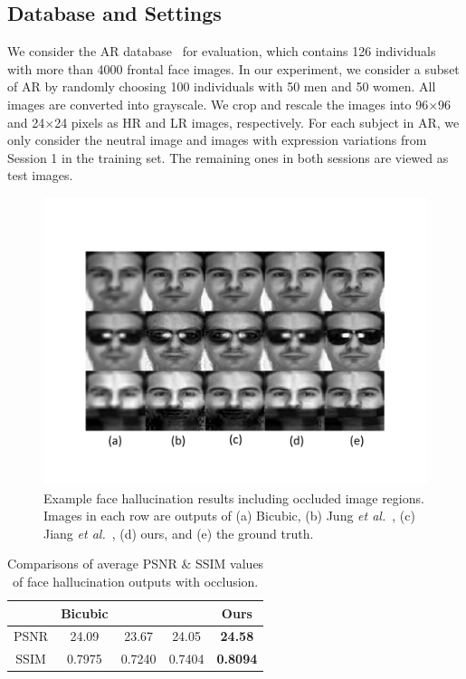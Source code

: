 \subsection{Database and Settings}
We consider the AR database~\cite{Martinez_CVC1998} for evaluation, which contains 126 individuals with more than 4000 frontal face images. In our experiment, we consider a subset of AR by randomly choosing 100 individuals with 50 men and 50 women. All images are converted into grayscale. We crop and rescale the images into 96$\times$96 and 24$\times$24 pixels as HR and LR images, respectively. For each subject in AR, we only consider the neutral image and images with expression variations from Session 1 in the training set. The remaining ones in both sessions are viewed as test images.
\begin{figure}
\graphicspath{{fig/}}
        \begin{center}
            \includegraphics[scale=0.32]{exp_ori.pdf}
            \vspace{-0.3cm}
            \caption{\small{Example face hallucination results including occluded image regions. Images in each row are outputs of (a) Bicubic, (b) Jung \emph{et al.}~\cite{convex}, (c) Jiang \emph{et al.}~\cite{Jiang_TMM2014}, (d) ours, and (e) the ground truth.} \label{fig:exp_ori}}
        \end{center}\vspace{-.5cm}
\end{figure}

\begin{table}
\small
\renewcommand{\arraystretch}{1.2}
\centering
\caption{\small{Comparisons of average PSNR \& SSIM values of face hallucination outputs with occlusion.}}\label{tab:partA}
\vspace{0.2cm}
\begin{tabular}{|c|c|c|c|c|}
\hline
 & Bicubic & \cite{convex} & \cite{Jiang_TMM2014}  & Ours\\
\hline
PSNR  & 24.09 & 23.67 & 24.05 & \textbf{24.58}\\
\hline
SSIM  & 0.7975 & 0.7240 & 0.7404 & \textbf{0.8094}\\
\hline
\end{tabular}\vspace{-.3cm}
\end{table}


